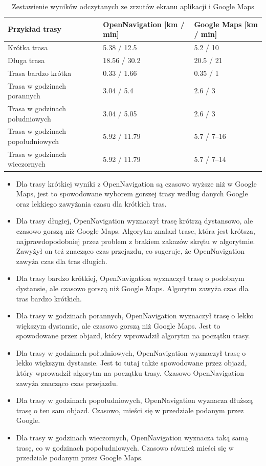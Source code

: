 \documentclass[12pt]{article}
\begin{document}
\begin{table}[H]
    \centering
    \small
    \caption{Zestawienie wyników odczytanych ze zrzutów ekranu aplikacji i Google Maps}
    \label{tab:app-screens-results}
    \begin{tabular}{|p{4.6cm}|p{4.2cm}|p{4.2cm}|}
        \hline
        \textbf{Przykład trasy} & \textbf{OpenNavigation [km / min]} & \textbf{Google Maps [km / min]} \\ \hline
        Krótka trasa & 5.38 / 12.5 & 5.2 / 10 \\ \hline
        Długa trasa & 18.56 / 30.2 & 20.5 / 21 \\ \hline
        Trasa bardzo krótka & 0.33 / 1.66 & 0.35 / 1 \\ \hline
        Trasa w godzinach porannych & 3.04 / 5.4 & 2.6 / 3 \\ \hline
        Trasa w godzinach południowych & 3.04 / 5.05 & 2.6 / 3 \\ \hline
        Trasa w godzinach popołudniowych & 5.92 / 11.79 & 5.7 / 7--16 \\ \hline
        Trasa w godzinach wieczornych & 5.92 / 11.79 & 5.7 / 7--14 \\ \hline
    \end{tabular}
\end{table}

\begin{itemize}
    \item Dla trasy krótkiej wyniki z OpenNavigation są czasowo wyższe niż w Google Maps, jest to spowodowane wyborem gorszej trasy według danych Google oraz lekkiego zawyżania czasu dla krótkich tras.
    \item Dla trasy długiej, OpenNavigation wyznaczył trasę krótrzą dystansowo, ale czasowo gorszą niż Google Maps. Algorytm znalazł trase, która jest krótsza, najprawdopodobniej przez problem z brakiem zakazów skrętu w algorytmie. Zawyżył on też znacząco czas przejazdu, co sugeruje, że OpenNavigation zawyża czas dla tras długich.
    \item Dla trasy bardzo krótkiej, OpenNavigation wyznaczył trasę o podobnym dystansie, ale czasowo gorszą niż Google Maps. Algorytm zawyża czas dla tras bardzo krótkich.
    \item Dla trasy w godzinach porannych, OpenNavigation wyznaczył trasę o lekko większym dystansie, ale czasowo gorszą niż Google Maps. Jest to spowodowane przez objazd, który wprowadził algorytm na początku trasy.
    \item Dla trasy w godzinach południowych, OpenNavigation wyznaczył trasę o lekko większym dystansie. Jest to tutaj także spowodowane przez objazd, który wprowadził algorytm na początku trasy. Czasowo OpenNavigation zawyża znacząco czas przejazdu.
    \item Dla trasy w godzinach popołudniowych, OpenNavigation wyznacza dłuższą trasę o ten sam objazd. Czasowo, mieści się w przedziale podanym przez Google.
    \item Dla trasy w godzinach wieczornych, OpenNavigation wyznacza taką samą trasę, co w godzinach popołudniowych. Czasowo również mieści się w przedziale podanym przez Google Maps.
\end{itemize}
\end{document}
